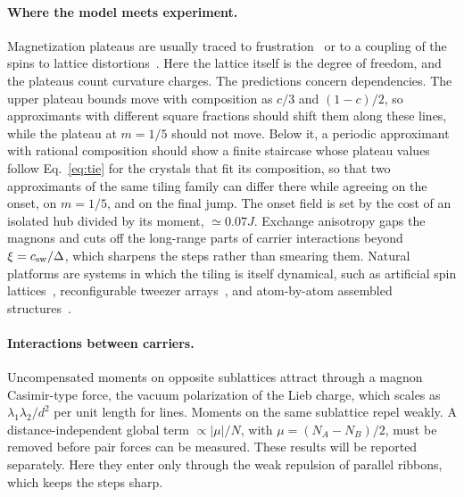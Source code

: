 \documentclass[aps,prb,twocolumn,superscriptaddress,floatfix]{revtex4-2}
\begin{document}
\paragraph*{Where the model meets experiment.} Magnetization plateaus are usually traced to frustration~\cite{Kageyama1999,Honecker2004} or to a coupling of the spins to lattice distortions~\cite{Penc2004,Vekua2006}. Here the lattice itself is the degree of freedom, and the plateaus count curvature charges. The predictions concern dependencies. The upper plateau bounds move with composition as $c/3$ and $(1-c)/2$, so approximants with different square fractions should shift them along these lines, while the plateau at $m=1/5$ should not move. Below it, a periodic approximant with rational composition should show a finite staircase whose plateau values follow Eq.~\eqref{eq:tie} for the crystals that fit its composition, so that two approximants of the same tiling family can differ there while agreeing on the onset, on $m=1/5$, and on the final jump. The onset field is set by the cost of an isolated hub divided by its moment, $\simeq0.07J$. Exchange anisotropy gaps the magnons and cuts off the long-range parts of carrier interactions beyond $\xi=c_{\rm sw}/\Delta$, which sharpens the steps rather than smearing them. Natural platforms are systems in which the tiling is itself dynamical, such as artificial spin lattices~\cite{Skjaervo2020}, reconfigurable tweezer arrays~\cite{Browaeys2020,Scholl2021}, and atom-by-atom assembled structures~\cite{Khajetoorians2019}.

\paragraph*{Interactions between carriers.} Uncompensated moments on opposite sublattices attract through a magnon Casimir-type force, the vacuum polarization of the Lieb charge, which scales as $\lambda_1\lambda_2/d^2$ per unit length for lines. Moments on the same sublattice repel weakly. A distance-independent global term $\propto|\mu|/N$, with $\mu=(N_A-N_B)/2$, must be removed before pair forces can be measured. These results will be reported separately. Here they enter only through the weak repulsion of parallel ribbons, which keeps the steps sharp.
\end{document}
